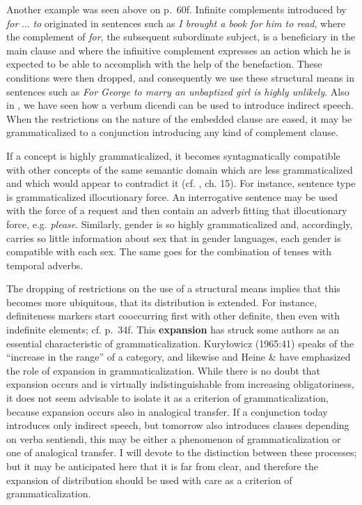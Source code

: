 Another example was seen above on p.~60f. Infinite complements introduced by \textit{for} ... \textit{to} originated in sentences such as \textit{I brought a book for him to read}, where the complement of \textit{for}, the subsequent subordinate subject, is a beneficiary in the main clause and where the infinitive complement expresses an action which he is expected to be able to accomplish with the help of the benefaction. These conditions were then dropped, and consequently we use these structural means in sentences such as \textit{For George to marry an unbaptized girl is highly unlikely}. Also in , we have seen how a verbum dicendi can be used to introduce indirect speech. When the restrictions on the nature of the embedded clause are eased, it may be grammaticalized to a conjunction introducing any kind of complement clause.

If a concept is highly grammaticalized, it becomes syntagmatically compatible with other concepts of the same semantic domain which are less grammaticalized and which would appear to contradict it (cf. \citet{Paul1920}, ch. 15). For instance, sentence type is grammaticalized illocutionary force. An interrogative sentence may be used with the force of a request and then contain an adverb fitting that illocutionary force, e.g. \textit{please}. Similarly, gender is so highly grammaticalized and, accordingly, carries so little information about sex that in gender languages, each gender is compatible with each sex. The same goes for the combination of tenses with temporal adverbs.

The dropping of restrictions on the use of a structural means implies that this becomes more ubiquitous, that its distribution is extended. For instance, definiteness markers start cooccurring first with other definite, then even with indefinite elements; cf. p.~34f. This \textbf{expansion} has struck some authors as an essential characteristic of grammaticalization. Kuryłowicz (1965:41) speaks of the “increase in the range” of a category, and likewise \citet[184-188]{Lord1976} and Heine \& \citet[39-41]{Reh1984} have emphasized the role of expansion in grammaticalization. While there is no doubt that expansion occurs and is virtually indistinguishable from increasing obligatoriness, it does not seem advisable to isolate it as a criterion of grammaticalization, because expansion occurs also in analogical transfer. If a conjunction today introduces only indirect speech, but tomorrow also introduces clauses depending on verba sentiendi, this may be either a phenomenon of grammaticalization or one of analogical transfer. I will devote  to the distinction between these processes; but it may be anticipated here that it is far from clear, and therefore the expansion of distribution should be used with care as a criterion of grammaticalization.

